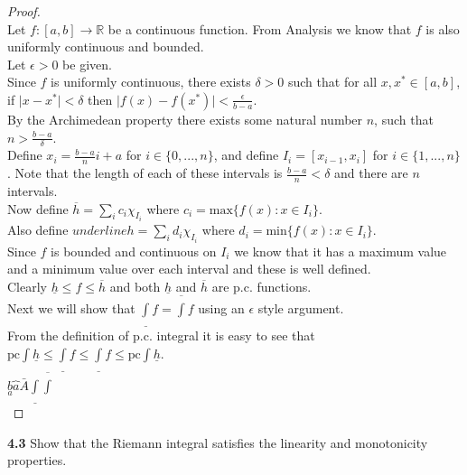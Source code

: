 \documentclass[12pt]{article}
\begin{document}
	\begin{proof}  \text{ }\\
		Let $f : [a,b] \to \mathbb{R}$ be a continuous function. From Analysis we know that $f$ is also uniformly continuous and bounded.\\
		Let $\epsilon > 0$ be given. \\
		Since $f$ is uniformly continuous, there exists $ \delta >0$ such that for all $x,x^* \in [a,b]$, if $\vert x - x^* \vert < \delta$ then $\vert f(x) - f(x^*) \vert < \frac{\epsilon}{b-a}$.\\
		By the Archimedean property there exists some natural number $n$, such that $n > \frac{b-a}{\delta}$. \\
		Define $x_i = \frac{b-a}{n} i+ a$ for $i \in \{0,...,n\}$, and define $I_i = [x_{i-1}, x_i]$ for $i \in \{1,...,n\}$. Note that the length of each of these intervals is $\frac{b-a}{n} < \delta$ and there are $n$ intervals. \\
		Now define $\overline{h} = \sum\limits_i c_i \chi_{I_i}$ where $c_i = \text{max} \{f(x) : x \in I_i\}$. \\
		Also define $underline{h} = \sum\limits_i d_i \chi_{I_i}$ where $d_i = \text{min} \{f(x) : x \in I_i\}$. \\
		Since $f$ is bounded and continuous on $I_i$ we know that it has a maximum value and a minimum value over each interval and these is well defined. \\
		Clearly $\underline{h} \leq f \leq \overline{h}$ and both $\underline{h}$ and $\overline{h}$ are p.c. functions.\\
		
		Next we will show that $\underline{\int}f = \overline{\int}f$ using an $\epsilon$ style argument. \\
		
		From the definition of p.c. integral it is easy to see that $\text{pc}\int\underline{h} \leq \underline{\int}f \leq \underline{\int}f \leq \text{pc}\int\underline{h}$. \\
		
		$\underset{a}{b} \overbrace{a} \bar{A} \underline{\int} \overline{\int}$\\
		
		
		
	\end{proof}



\hspace{-4 ex}\textbf{4.3} Show that the Riemann integral satisfies the linearity and monotonicity properties. \bigbreak
\end{document}
